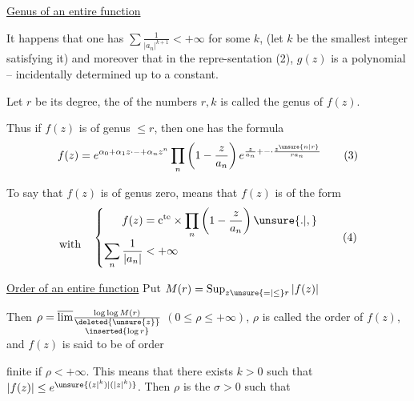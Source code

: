 
\uline{Genus of an entire function}

It happens that one has $\sum\frac{1}{|a_n|^{k+1}}<+\infty$ for some $k$, (let $k$ be the smallest integer satisfying it) and moreover that in the repre-\newline sentation (2), $g(z)$ is a polynomial -- incidentally determined up to a constant.

Let $r$ be its degree, the   of the numbers $r,k$ is called the genus of $f(z)$.

Thus if $f(z)$ is of genus $\leq r$, then one has the formula
\[
f(z)=e^{\alpha_0+\alpha_1 z\mathord{\cdot}\mathord{-}+\alpha_n z^n}\prod_n\left(1-\frac{z}{a_n}\right)e^{\frac{z}{a_n}+\mathord{-}\mathord{\cdot}\frac{z^{\unsure{n|r}}}{r a_n}}\tag*{(3)}
\]

To say that $f(z)$ is of genus zero, means that $f(z)$ is of the form
\[
\begin{aligned}\vphantom{f(z)}\\[-2pt]\text{with}\quad\end{aligned}
\left\{\begin{aligned}
f(z)&=\mathrm c^{\mathrm{te}}\times\prod_n\left(1-\frac{z}{a_n}\right)\unsure{.|,}\\[-2pt]
\sum_n\frac{1}{|a_n|}&<+\infty
\end{aligned}\right.\tag*{(4)}
\]

\uline{Order of an entire function} \quad Put $M(r)=\mathop{\rm Sup}_{z\unsure{=|\leq}r}|f(z)|$

Then $\rho=\overline{\lim}\frac{\log\log M(r)}{\substack{\deleted{\unsure{z}}\\\inserted{\log r}}}$ \quad $(0\leq\rho\leq+\infty)$, $\rho$ is called the order of $f(z)$, and $f(z)$ is said to be of order
\par\noindent\hspace{2cm}\unsure{$=$}\par\noindent
finite if $\rho<+\infty$. This means that there exists $k>0$ such that $|f(z)|\leq e^{\unsure{(z\vert^k)|(\lvert z\rvert^k)}}$. Then $\rho$ is the   $\sigma>0$ such that

